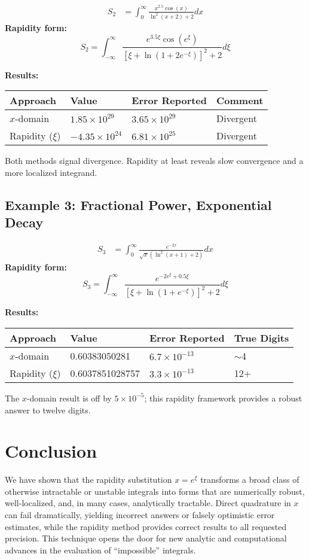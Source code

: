 \documentclass[12pt]{article}
\begin{document}
\begin{align*}
S_2 &= \int_0^\infty \frac{x^{2.5} \cos(x)}{\ln^2(x+2) + 2} dx
\end{align*}
\noindent
\textbf{Rapidity form:}
\[
S_2 = \int_{-\infty}^{\infty} \frac{e^{3.5\xi}\cos(e^{\xi})}{[\xi+\ln(1+2e^{-\xi})]^2 + 2} d\xi
\]

\noindent
\textbf{Results:}
\begin{center}
\begin{tabular}{l|l|l|l}
Approach          & Value                 & Error Reported     & Comment     \\
\hline
$x$-domain        & $1.85 \times 10^{29}$ & $3.65 \times 10^{29}$ & Divergent  \\
Rapidity ($\xi$)  & $-4.35 \times 10^{24}$& $6.81 \times 10^{25}$ & Divergent  \\
\end{tabular}
\end{center}
Both methods signal divergence. Rapidity at least reveals slow convergence and a more localized integrand.

\subsection{Example 3: Fractional Power, Exponential Decay}

\begin{align*}
S_3 &= \int_0^\infty \frac{e^{-2x}}{\sqrt{x}(\ln^2(x+1)+2)} dx
\end{align*}
\noindent
\textbf{Rapidity form:}
\[
S_3 = \int_{-\infty}^{\infty} \frac{e^{-2e^{\xi} + 0.5\xi}}{[\xi+\ln(1+e^{-\xi})]^2 + 2} d\xi
\]

\noindent
\textbf{Results:}
\begin{center}
\begin{tabular}{l|l|l|l}
Approach          & Value            & Error Reported     & True Digits  \\
\hline
$x$-domain        & 0.60383050281    & $6.7 \times 10^{-13}$ & $\sim$4     \\
Rapidity ($\xi$)  & 0.6037851028757  & $3.3 \times 10^{-13}$ & 12+         \\
\end{tabular}
\end{center}
The $x$-domain result is off by $5\times 10^{-5}$; this rapidity framework provides a robust answer to twelve digits.

\section{Conclusion}

We have shown that the rapidity substitution $x=e^{\xi}$ transforms a broad class of otherwise intractable or unstable integrals into forms that are numerically robust, well-localized, and, in many cases, analytically tractable. Direct quadrature in $x$ can fail dramatically, yielding incorrect answers or falsely optimistic error estimates, while the rapidity method provides correct results to all requested precision. This technique opens the door for new analytic and computational advances in the evaluation of ``impossible'' integrals.
\end{document}
